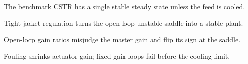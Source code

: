 \begin{highlights}
\item The benchmark CSTR has a single stable steady state unless the feed is cooled.
\item Tight jacket regulation turns the open-loop unstable saddle into a stable plant.
\item Open-loop gain ratios misjudge the master gain and flip its sign at the saddle.
\item Fouling shrinks actuator gain; fixed-gain loops fail before the cooling limit.
\end{highlights}
